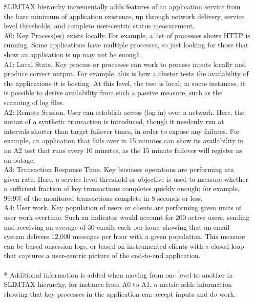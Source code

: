 \documentclass[english]{tktltiki2}
\theoremstyle{definition}
\theoremstyle{remark}
\begin{document}
SLIMTAX  hierarchy  incrementally  adds features  of  an  application  service  from  the bare  minimum  of  application  existence, up through    network    delivery,    service    level thresholds,  and  complete  user-centric  status measurement.\\ 
A0: Key Process(es) exists locally. For example, a list of processes shows HTTP is running. Some applications have multiple processes, so just looking  for those that show an application is up may not be enough.\\
A1: Local State. Key process or processes can work to process inputs locally and produce correct output. For example, this is how a cluster tests  the  availability of the applications it is hosting. At this level, the test is local; in some instances, it is possible to derive availability from such  a  passive measure, such as the scanning of log files.\\
A2: Remote Session. User can establish access (log  in) over  a network.  Here, the notion of a synthetic transaction is introduced, though it  needonly run at  intervals  shorter  than  target failover  times,  in  order to  expose  any failures.  For  example,  an  application  that fails  over  in  15  minutes  can  show  its availability in an A2 test that runs every 10 minutes,  as  the  15  minute  failover  will register as an outage.\\
A3: Transaction Response Time. Key business operations are performing ata   given   rate. Here, a service level threshold  or  objective  is  used  to  measure whether a  sufficient fraction of key transactions   completes   quickly   enough; for example, 99.9\% of the monitored transactions complete in 8 seconds or less.\\
A4: User work. Key population of users or clients are performing given units of user work overtime. Such an indicator would account for 200 active users, sending and receiving an average of 30 emails each per hour, showing that  an email  system  delivers 12,000 messages per hour with a  given population. This measure can be based onsession logs,  or  based  on  instrumented clients with a closed-loop that captures a user-centric   picture of the end-to-end application.\\ \\*
Additional information is added when moving from one level to another in SLIMTAX hierarchy, for instance from A0 to A1, a metric adds information showing that key processes in the application can accept inputs and do work.
\end{document}
